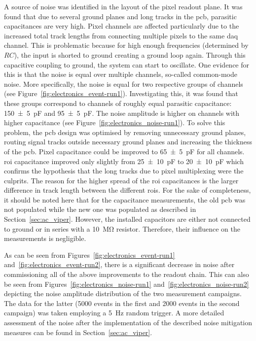 A source of noise was identified in the layout of the pixel readout plane.
It was found that due to several ground planes and long tracks in the \gls{pcb}, parasitic capacitances are very high.
Pixel channels are affected particularly due to the increased total track lengths from connecting multiple pixels to the same \gls{daq} channel.
This is problematic because for high enough frequencies (determined by $RC$), the input is shorted to ground creating a ground loop again.
Through this capacitive coupling to ground, the system can start to oscillate.
One evidence for this is that the noise is equal over multiple channels, so-called common-mode noise.
More specifically, the noise is equal for two respective groups of channels (see Figure~\ref{fig:electronics_event-run1}).
Investigating this, it was found that these groups correspond to channels of roughly equal parasitic capacitance: \SI{150 +- 5}{\pico\farad} and \SI{95 +- 5}{\pico\farad}.
The noise amplitude is higher on channels with higher capacitance (see Figure~\ref{fig:electronics_noise-run1}).
To solve this problem, the \gls{pcb} design was optimised by removing unnecessary ground planes, routing signal tracks outside necessary ground planes and increasing the thickness of the \gls{pcb}.
Pixel capacitance could be improved to \SI{65 +- 5}{\pico\farad} for all channels.
\gls{roi} capacitance improved only slightly from \SI{25 +- 10}{\pico\farad} to \SI{20 +- 10}{\pico\farad} which confirms the hypothesis that the long tracks due to pixel multiplexing were the culprits.
The reason for the higher spread of the \gls{roi} capacitances is the larger difference in track length between the different \glspl{roi}.
For the sake of completeness, it should be noted here that for the capacitance measurements, the old \gls{pcb} was not populated while the new one was populated as described in Section~\ref{sec:ac_viper}.
However, the installed capacitors are either not connected to ground or in series with a \SI{10}{\mega\ohm} resistor.
Therefore, their influence on the measurements is negligible.

As can be seen from Figures~\ref{fig:electronics_event-run1} and~\ref{fig:electronics_event-run2}, there is a significant decrease in noise after commissioning all of the above improvements to the readout chain.
This can also be seen from Figures~\ref{fig:electronics_noise-run1} and~\ref{fig:electronics_noise-run2} depicting the noise amplitude distribution of the two measurement campaigns.
The data for the latter (\num{5000} events in the first and \num{2000} events in the second campaign) was taken employing a \SI{5}{\hertz} random trigger.
A more detailed assessment of the noise after the implementation of the described noise mitigation measures can be found in Section~\ref{sec:ac_viper}.

